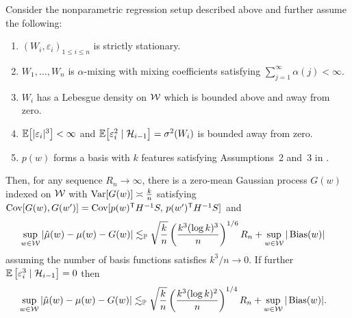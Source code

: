 \begin{proposition}%
  \label{pro:series}
  Consider the nonparametric regression setup described above
  and further assume the following:
  \begin{enumerate}[label=(\roman*)]

    \item
      $(W_i, \varepsilon_i)_{1 \leq i \leq n}$
      is strictly stationary.

    \item
      $W_1, \ldots, W_n$ is $\alpha$-mixing with mixing coefficients
      satisfying $\sum_{j=1}^\infty \alpha(j) < \infty$.

    \item
      $W_i$ has a Lebesgue density on $\mathcal{W}$
      which is bounded above and away from zero.

    \item
      $\mathbb{E}\big[|\varepsilon_i|^3 \big] < \infty$
      and
      $\mathbb{E}\big[\varepsilon_i^2 \mid \mathcal{H}_{i-1}\big]=\sigma^2(W_i)$
      is bounded away from zero.

    \item
      $p(w)$ forms a basis with $k$ features satisfying
      Assumptions~2 and~3 in \citet{cattaneo2020large}.

  \end{enumerate}
  Then, for any sequence $R_n \to \infty$,
  there is a zero-mean Gaussian process
  $G(w)$ indexed on $\mathcal{W}$
  with $\operatorname{Var}[G(w)] \asymp\frac{k}{n}$
  satisfying
  $\operatorname{Cov}[G(w), G(w')]
  = \operatorname{Cov}[p(w)^{\mathsf{T}} H^{-1} S,\, p(w')^{\mathsf{T}} H^{-1} S]$
  and
  \begin{align*}
    \sup_{w \in \mathcal{W}}
    \left| \hat\mu(w) - \mu(w) - G(w) \right|
    &\lesssim_{\mathbb{P}}
    \sqrt{\frac{k}{n}}
    \left( \frac{k^3 (\log k)^3}{n} \right)^{1/6} R_n
    + \sup_{w \in \mathcal{W}} |\operatorname{Bias}(w)|
  \end{align*}
  assuming the number of basis functions satisfies $k^3 / n \to 0$.
  If further $\mathbb{E} \left[ \varepsilon_i^3 \mid \mathcal{H}_{i-1} \right] = 0$ then
  \begin{align*}
    \sup_{w \in \mathcal{W}}
    \left| \hat\mu(w) - \mu(w) - G(w) \right|
    &\lesssim_{\mathbb{P}}
    \sqrt{\frac{k}{n}}
    \left( \frac{k^3 (\log k)^2}{n} \right)^{1/4} R_n
    + \sup_{w \in \mathcal{W}} |\operatorname{Bias}(w)|.
  \end{align*}
\end{proposition}

